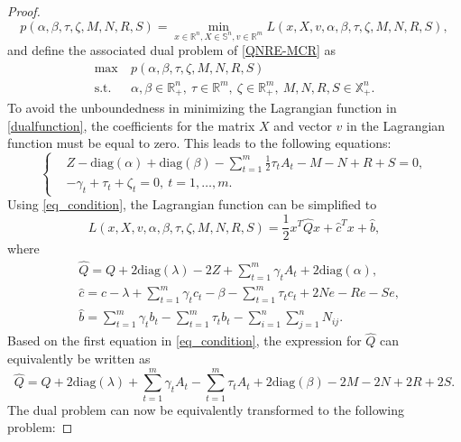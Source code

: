 \documentclass[pdflatex,sn-mathphys-num]{sn-jnl}%
\theoremstyle{thmstyleone}%
\theoremstyle{thmstyletwo}%
\theoremstyle{thmstylethree}%
\begin{document}
\begin{proof}
	\begin{equation}\label{dualfunction}
		p(\alpha,\beta,\tau,\zeta,M,N,R,S)=\min_{x\in\mathbb{R}^n,X\in\mathbb{S}^n,v\in\mathbb{R}^m}L(x,X,v,\alpha,\beta,\tau,\zeta,M,N,R,S),
	\end{equation}
	and define the associated dual problem of \eqref{QNRE-MCR} as
	\begin{equation}\label{QNR-dual}
		\begin{aligned}
			\max ~&p(\alpha,\beta,\tau,\zeta,M,N,R,S)\\
			\mbox{s.t.} ~~&\alpha,\beta\in \mathbb{R}^n_+,~\tau\in \mathbb{R}^m,~\zeta\in \mathbb{R}^m_+, ~M,N,R,S\in\mathbb{X}_+^n.
		\end{aligned}
	\end{equation}
	To avoid the unboundedness in minimizing the Lagrangian function in \eqref{dualfunction}, the coefficients for the matrix $X$ and vector $v$ in the Lagrangian function must be equal to zero. This leads to the following equations:
	\begin{equation}\label{eq_condition}
		\left\{
		\begin{aligned}
			&Z-\textrm{diag}(\alpha)+\textrm{diag}(\beta)-\sum_{t=1}^m\frac{1}{2} \tau_t A_t-M-N+R+S= 0,\\
			&-\gamma_t+\tau_t+\zeta_t=0,~t=1,\ldots,m.
		\end{aligned}\right.
	\end{equation}
	Using \eqref{eq_condition}, the Lagrangian function can be simplified to
	\begin{equation}
		L(x,X,v,\alpha,\beta,\tau,\zeta,M,N,R,S) = \frac{1}{2}x^T \hat{Q} x + \hat{c}^T x + \hat{b},
	\end{equation}
	where
	\begin{align}
		&\hat{Q}=Q+2\textrm{diag}(\lambda)-2Z+\sum_{t=1}^m \gamma_t A_t +2\textrm{diag}(\alpha),\\
		&\hat{c}=c-\lambda+\sum_{t=1}^m \gamma_t c_t-\beta- \sum_{t=1}^m \tau_t c_t +2Ne-Re-Se,\\
		&\hat{b}=\sum_{t=1}^m \gamma_t b_t-\sum_{t=1}^m \tau_t b_t-\sum_{i=1}^n\sum_{j=1}^n N_{ij}.
	\end{align}
	Based on the first equation in \eqref{eq_condition}, the expression for $\hat{Q}$ can equivalently be written as
	\begin{equation}
		\hat{Q}=Q+2\textrm{diag}(\lambda)+\sum_{t=1}^m\gamma_t A_t-\sum_{t=1}^m \tau_t A_t +2\textrm{diag}(\beta)-2M-2N+2R+2S.
	\end{equation}
	The dual problem can now be equivalently transformed to the following problem:

\end{proof}
\end{document}
